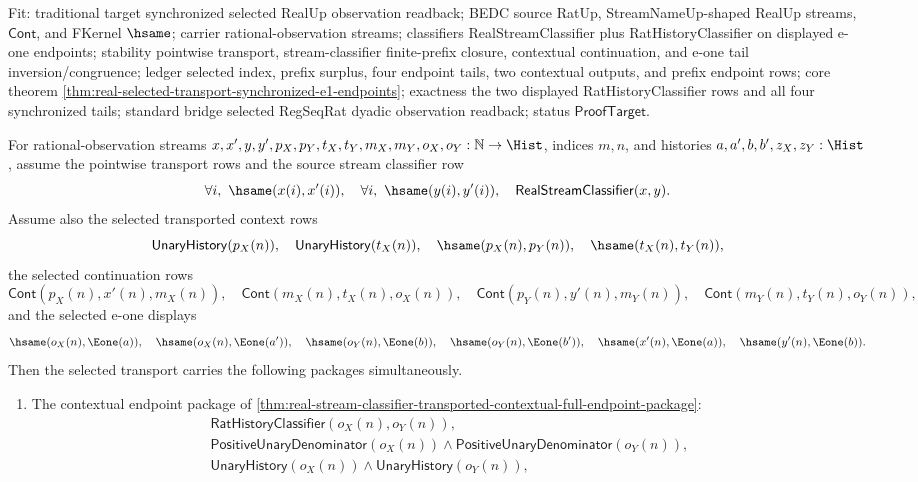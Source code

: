 Fit: traditional target synchronized selected RealUp observation readback; BEDC
source RatUp, StreamNameUp-shaped RealUp streams, $\mathsf{Cont}$, and FKernel
$\hsame$; carrier rational-observation streams; classifiers
RealStreamClassifier plus RatHistoryClassifier on displayed e-one endpoints;
stability pointwise transport, stream-classifier finite-prefix closure,
contextual continuation, and e-one tail inversion/congruence; ledger selected
index, prefix surplus, four endpoint tails, two contextual outputs, and prefix
endpoint rows; core theorem
\autoref{thm:real-selected-transport-synchronized-e1-endpoints}; exactness the
two displayed RatHistoryClassifier rows and all four synchronized tails;
standard bridge selected RegSeqRat dyadic observation readback; status
$\mathsf{ProofTarget}$.

\begin{theorem}
\label{thm:real-selected-transport-fit-synchronized-package}
For rational-observation streams
$x,x',y,y',p_X,p_Y,t_X,t_Y,m_X,m_Y,o_X,o_Y:\mathbb{N}\to\Hist$,
indices $m,n$, and histories $a,a',b,b',z_X,z_Y:\Hist$, assume the pointwise
transport rows and the source stream classifier row
$$
\forall i,\ \hsame(x(i),x'(i)),\quad
\forall i,\ \hsame(y(i),y'(i)),\quad
\mathsf{RealStreamClassifier}(x,y).
$$
Assume also the selected transported context rows
$$
\mathsf{UnaryHistory}(p_X(n)),\quad
\mathsf{UnaryHistory}(t_X(n)),\quad
\hsame(p_X(n),p_Y(n)),\quad
\hsame(t_X(n),t_Y(n)),
$$
the selected continuation rows
$$
\mathsf{Cont}(p_X(n),x'(n),m_X(n)),\quad
\mathsf{Cont}(m_X(n),t_X(n),o_X(n)),
\quad\mathsf{Cont}(p_Y(n),y'(n),m_Y(n)),\quad
\mathsf{Cont}(m_Y(n),t_Y(n),o_Y(n)),
$$
and the selected e-one displays
$$
\hsame(o_X(n),\Eone(a)),\quad
\hsame(o_X(n),\Eone(a')),\quad
\hsame(o_Y(n),\Eone(b)),\quad
\hsame(o_Y(n),\Eone(b')),\quad
\hsame(x'(n),\Eone(a)),\quad
\hsame(y'(n),\Eone(b)).
$$
Then the selected transport carries the following packages simultaneously.
\begin{enumerate}
\item The contextual endpoint package of
\autoref{thm:real-stream-classifier-transported-contextual-full-endpoint-package}:
$$
\begin{array}{l}
\mathsf{RatHistoryClassifier}(o_X(n),o_Y(n)),\\
\mathsf{PositiveUnaryDenominator}(o_X(n))\land
\mathsf{PositiveUnaryDenominator}(o_Y(n)),\\
\mathsf{UnaryHistory}(o_X(n))\land
\mathsf{UnaryHistory}(o_Y(n)),\\

\end{array}$$
\end{enumerate}
\end{theorem}
